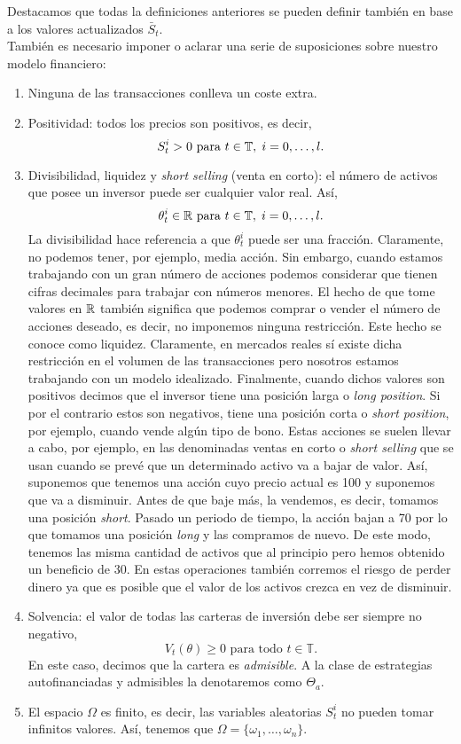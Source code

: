 Destacamos que todas la definiciones anteriores se pueden definir también en base a los valores actualizados $ \bar{S}_t $. \\

También es necesario imponer o aclarar una serie de suposiciones sobre nuestro modelo financiero:
\begin{enumerate}
	\item Ninguna de las transacciones conlleva un coste extra.
	\item Positividad: todos los precios son positivos, es decir,
	\[
	S_t^i > 0 \text{ para } t \in \mathbb{T},\hspace{1mm} i=0,\dots,l.
	\]
	\item Divisibilidad, liquidez y \textit{short selling} (venta en corto): el número de activos que posee un inversor puede ser cualquier valor real. Así,
	\[
	\theta_t^i \in \mathbb{R} \text{ para } t \in \mathbb{T},\hspace{1mm} i=0,\dots,l.
	\]
	La divisibilidad hace referencia a que $ \theta_t^i $ puede ser una fracción. Claramente, no podemos tener, por ejemplo, media acción. Sin embargo, cuando estamos trabajando con un gran número de acciones podemos considerar que tienen cifras decimales para trabajar con números menores. El hecho de que tome valores en $ \mathbb{R} $ también significa que podemos comprar o vender el número de acciones deseado, es decir, no imponemos ninguna restricción. Este hecho se conoce como liquidez. Claramente, en mercados reales sí existe dicha restricción en el volumen de las transacciones pero nosotros estamos trabajando con un modelo idealizado. Finalmente, cuando dichos valores son positivos decimos que el inversor tiene una posición larga o \textit{long position}. Si por el contrario estos son negativos, tiene una posición corta o \textit{short position}, por ejemplo, cuando vende algún tipo de bono. Estas acciones se suelen llevar a cabo, por ejemplo, en las denominadas ventas en corto o \textit{short selling} que se usan cuando se prevé que un determinado activo va a bajar de valor. Así, suponemos que tenemos una acción cuyo precio actual es 100 y suponemos que va a disminuir. Antes de que baje más, la vendemos, es decir, tomamos una posición \textit{short}. Pasado un periodo de tiempo, la acción bajan a 70 por lo que tomamos una posición \textit{long} y las compramos de nuevo. De este modo, tenemos las misma cantidad de activos que al principio pero hemos obtenido un beneficio de 30. En estas operaciones también corremos el riesgo de perder dinero ya que es posible que el valor de los activos crezca en vez de disminuir. 
	
	\item Solvencia: el valor de todas las carteras de inversión debe ser siempre no negativo,
	\[
	V_t (\theta) \geq 0\text{ para todo } t \in \mathbb{T}.
	\]
	En este caso, decimos que la cartera es \textit{admisible}. A la clase de estrategias autofinanciadas y admisibles la denotaremos como $ \Theta_a $.
	\item El espacio $ \Omega $ es finito, es decir, las variables aleatorias $ S_t^i $ no pueden tomar infinitos valores. Así, tenemos que $ \Omega = \{ \omega_1,\dots,\omega_n\} $.
\end{enumerate}

